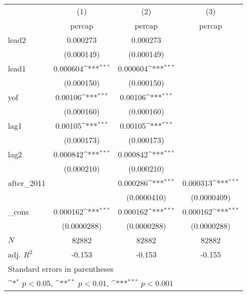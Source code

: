 {
\def\sym#1{\ifmmode^{#1}\else\(^{#1}\)\fi}
\begin{tabular}{l*{3}{c}}
\hline\hline
            &\multicolumn{1}{c}{(1)}&\multicolumn{1}{c}{(2)}&\multicolumn{1}{c}{(3)}\\
            &\multicolumn{1}{c}{percap}&\multicolumn{1}{c}{percap}&\multicolumn{1}{c}{percap}\\
\hline
lead2       &    0.000273         &    0.000273         &                     \\
            &  (0.000149)         &  (0.000149)         &                     \\
[1em]
lead1       &    0.000604\sym{***}&    0.000604\sym{***}&                     \\
            &  (0.000150)         &  (0.000150)         &                     \\
[1em]
yof         &     0.00106\sym{***}&     0.00106\sym{***}&                     \\
            &  (0.000160)         &  (0.000160)         &                     \\
[1em]
lag1        &     0.00105\sym{***}&     0.00105\sym{***}&                     \\
            &  (0.000173)         &  (0.000173)         &                     \\
[1em]
lag2        &    0.000842\sym{***}&    0.000842\sym{***}&                     \\
            &  (0.000210)         &  (0.000210)         &                     \\
[1em]
after\_2011  &                     &    0.000286\sym{***}&    0.000313\sym{***}\\
            &                     & (0.0000410)         & (0.0000409)         \\
[1em]
\_cons      &    0.000162\sym{***}&    0.000162\sym{***}&    0.000162\sym{***}\\
            & (0.0000288)         & (0.0000288)         & (0.0000288)         \\
\hline
\(N\)       &       82882         &       82882         &       82882         \\
adj. \(R^{2}\)&      -0.153         &      -0.153         &      -0.155         \\
\hline\hline
\multicolumn{4}{l}{\footnotesize Standard errors in parentheses}\\
\multicolumn{4}{l}{\footnotesize \sym{*} \(p<0.05\), \sym{**} \(p<0.01\), \sym{***} \(p<0.001\)}\\
\end{tabular}
}
